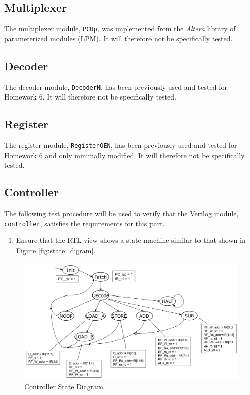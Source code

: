 \subsection{Multiplexer} %
\label{sub:multiplexer}

The multiplexer module, \verb|PCUp|, was implemented from the \emph{Altera} library of parameterized modules (LPM).
It will therefore not be specifically tested.


\subsection{Decoder} %
\label{sub:decoder}

The decoder module, \verb|DecoderN|, has been previously used and tested for Homework 6.
It will therefore not be specifically tested.

\subsection{Register} %
\label{sub:register}

The register module, \verb|RegisterOEN|, has been previously used and tested for Homework 6 and only minimally modified.
It will therefore not be specifically tested.

\FloatBarrier \subsection{Controller} %
\label{sub:controller_pro}

The following test procedure will be used to verify that the Verilog module, \verb|controller|, satisfies the requirements for this part.

\begin{enumerate}
    \item Ensure that the RTL view shows a state machine similar to that shown in \hyperref[fig:state_digram]{Figure \ref*{fig:state_digram}}.
\end{enumerate}

\begin{figure}[htbp]
    \includegraphics[width=\textwidth]{images/state_diagram.png}
    \caption{Controller State Diagram\label{fig:state_diagram}}
\end{figure}

